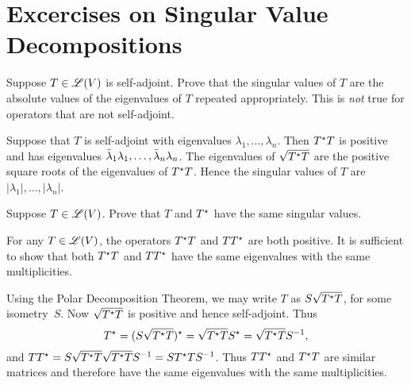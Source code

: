 \chapter{Excercises on Singular Value Decompositions}

\begin{exercise}
Suppose $T \in \mathscr{L}(V)$ is self-adjoint. Prove that the singular values of $T$
are the absolute values of the eigenvalues of $T$ repeated appropriately. This is
\emph{not} true for operators that are not self-adjoint.
\end{exercise}
\begin{solution}
Suppose that $T$ is self-adjoint with eigenvalues $\lambda_1, \ldots, \lambda_n$.
Then $T^{\star}T$ is positive and has eigenvalues
$\bar{\lambda}_1 \lambda_1, \ldots, \bar{\lambda}_n \lambda_n$. The eigenvalues
of $\sqrt{T^{\star}T}$ are the positive square roots of the eigenvalues of $T^{\star} T$.
Hence the singular values of $T$ are $|\lambda_1|, \ldots, |\lambda_n|$.
\end{solution}

\begin{exercise}
Suppose $T \in \mathscr{L}(V)$. Prove that $T$ and $T^{\star}$ have the same singular
values.
\end{exercise}
\begin{solution}
For any $T \in \mathscr{L}(V)$, the operators $T^{\star} T$ and $T T^{\star}$ are both
positive. It is sufficient to show that both $T^{\star} T$ and $T T^{\star}$ have the
same eigenvalues with the same multiplicities.

Using the Polar Decomposition Theorem, we may write $T$ as $S \sqrt{T^{\star} T}$, for
some isometry~$S$. Now $\sqrt{T^{\star} T}$ is positive and hence self-adjoint. Thus
\[
    T^{\star} = (S \sqrt{T^{\star} T})^{\star} = \sqrt{T^{\star} T} S^{\star} =
              \sqrt{T^{\star} T} S^{-1},
\]
and $T T^{\star} = S \sqrt{T^{\star} T} \sqrt{T^{\star} T} S^{-1} = S T^{\star} T S^{-1}$.
Thus $T T^{\star}$ and $T^{\star} T$ are similar matrices and therefore have the same
eigenvalues with the same multiplicities.
\end{solution}

